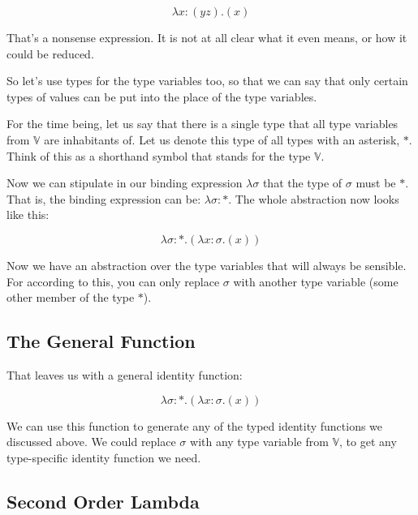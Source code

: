 \documentclass{book}
\numberwithin{equation}{chapter}
\begin{document}
\begin{equation}
\lambda x : (y z).( x )
\end{equation}

\noindent
That's a nonsense expression. It is not at all clear what it even means, or how it could be reduced.

So let's use types for the type variables too, so that we can say that only certain types of values can be put into the place of the type variables.

For the time being, let us say that there is a single type that all type variables from $\mathbb{V}$ are inhabitants of. Let us denote this type of all types with an asterisk, $*$. Think of this as a shorthand symbol that stands for the type $\mathbb{V}$.

Now we can stipulate in our binding expression $\lambda \sigma$ that the type of $\sigma$ must be $*$. That is, the binding expression can be: $\lambda \sigma : *$. The whole abstraction now looks like this:

\begin{equation}
\lambda \sigma : *.(\lambda x : \sigma.( x ))
\end{equation}

\noindent
Now we have an abstraction over the type variables that will always be sensible. For according to this, you can only replace $\sigma$ with another type variable (some other member of the type $*$).


\subsection{The General Function}

That leaves us with a general identity function:

\begin{equation}
\lambda \sigma : *.(\lambda x : \sigma.( x ))
\end{equation}

\noindent
We can use this function to generate any of the typed identity functions we discussed above. We could replace $\sigma$ with any type variable from $\mathbb{V}$, to get any type-specific identity function we need.


\subsection{Second Order Lambda}
\end{document}
